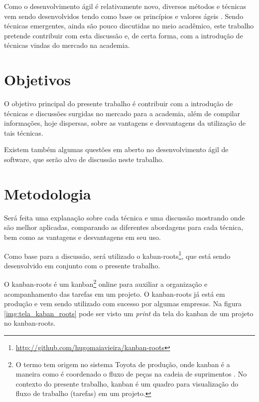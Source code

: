 Como o desenvolvimento ágil é relativamente novo, diversos métodos e técnicas vem sendo desenvolvidos tendo como base os princípios e valores ágeis \cite{BDDRodrigo}. Sendo técnicas emergentes, ainda são pouco discutidas no meio acadêmico, este trabalho pretende contribuir com esta discussão e, de certa forma, com a introdução de técnicas vindas do mercado na academia.


\section{Objetivos}

O objetivo principal do presente trabalho é contribuir com a introdução de técnicas e discussões surgidas no mercado para a academia, além de compilar informações, hoje dispersas, sobre as vantagens e desvantagens da utilização de tais técnicas.

Existem também algumas questões em aberto no desenvolvimento ágil de software, que serão alvo de discussão neste trabalho.

\section{Metodologia}

Será feita uma explanação sobre cada técnica e uma discussão mostrando onde são melhor aplicadas, comparando as diferentes abordagens para cada técnica, bem como as vantagens e desvantagens em seu uso.

Como base para a discussão, será utilizado o kaban-roots\footnote{\url{http://github.com/hugomaiavieira/kanban-roots}}, que está sendo desenvolvido em conjunto com o presente trabalho.

O kanban-roots é um kanban\footnote{O termo tem origem no sistema Toyota de produção, onde kanban é a maneira como é coordenado o fluxo de peças na cadeia de suprimentos  \cite{AMaquinaQueMudouOMundo}. No contexto do presente trabalho, kanban é um quadro para visualização do fluxo de trabalho (tarefas) em um projeto.} online para auxiliar a organização e acompanhamento das tarefas em um projeto. O kanban-roots já está em produção e vem sendo utilizado com sucesso por algumas empresas. Na figura \ref{img:tela_kaban_roots} pode ser visto um \textit{print} da tela do kanban de um projeto no kanban-roots.

